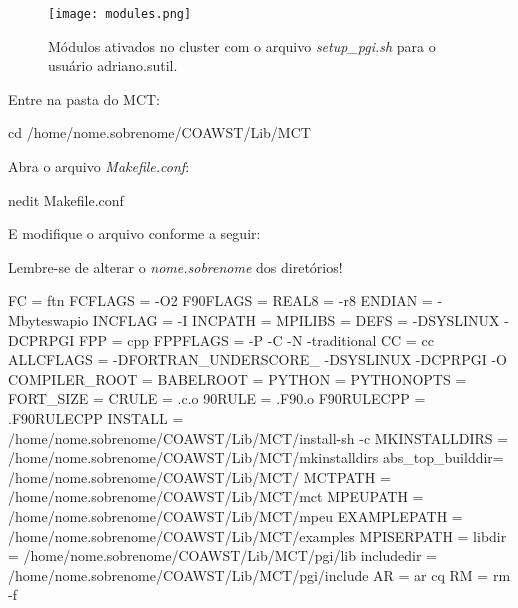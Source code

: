 \begin{figure}[H]
    \centering
    \texttt{[image: modules.png]}
    \caption{Módulos ativados no cluster com o arquivo \textit{setup\_pgi.sh} para o usuário adriano.sutil.}
    \label{modulos}
\end{figure}
\bigskip


\noindent Entre na pasta do MCT:
\bigskip

\begin{bashcode}
cd /home/nome.sobrenome/COAWST/Lib/MCT
\end{bashcode}
\bigskip

\noindent Abra o arquivo \textit{Makefile.conf}:
\bigskip


\begin{bashcode}
nedit Makefile.conf
\end{bashcode}
\bigskip

\noindent E modifique o arquivo conforme a seguir:
\bigskip

\begin{tcolorbox}[enhanced,
  grow to left by=0cm,%
  grow to right by=0cm,%
  enlarge top by=0cm,%
  enlarge bottom by=0cm,%
  tcbox raise base,
  boxrule=1.0pt,
  left=18mm,
  colframe=red!50!black,coltext=red!25!black,colback=red!10!white,
  overlay={\begin{tcbclipinterior}\fill[red!75!blue!50!white] (frame.south west)
    rectangle node[text=white,font=\sffamily\bfseries\footnotesize,rotate=0] {ATENÇÃO} ([xshift=18mm]frame.north west);\end{tcbclipinterior}}]
Lembre-se de alterar o \textit{nome.sobrenome} dos diretórios!
\end{tcolorbox}
\bigskip

\begin{bashcode}
FC  	    = ftn
FCFLAGS	 = -O2
F90FLAGS        = 
REAL8           = -r8
ENDIAN          = -Mbyteswapio
INCFLAG         = -I
INCPATH         =
MPILIBS         = 
DEFS            = -DSYSLINUX -DCPRPGI
FPP	     = cpp
FPPFLAGS        = -P -C -N -traditional
CC              = cc
ALLCFLAGS       = -DFORTRAN_UNDERSCORE_ -DSYSLINUX -DCPRPGI -O
COMPILER_ROOT   = 
BABELROOT       = 
PYTHON          = 
PYTHONOPTS      = 
FORT_SIZE       = 
CRULE           = .c.o
90RULE          = .F90.o
F90RULECPP      = .F90RULECPP
INSTALL         = /home/nome.sobrenome/COAWST/Lib/MCT/install-sh -c
MKINSTALLDIRS   = /home/nome.sobrenome/COAWST/Lib/MCT/mkinstalldirs
abs_top_builddir= /home/nome.sobrenome/COAWST/Lib/MCT/
MCTPATH         = /home/nome.sobrenome/COAWST/Lib/MCT/mct
MPEUPATH        = /home/nome.sobrenome/COAWST/Lib/MCT/mpeu
EXAMPLEPATH     = /home/nome.sobrenome/COAWST/Lib/MCT/examples
MPISERPATH      = 
libdir          = /home/nome.sobrenome/COAWST/Lib/MCT/pgi/lib
includedir      = /home/nome.sobrenome/COAWST/Lib/MCT/pgi/include
AR	      = ar cq
RM	      = rm -f
\end{bashcode}
\bigskip


